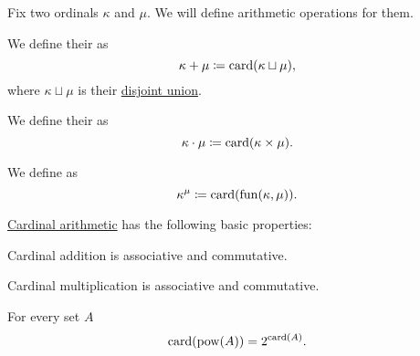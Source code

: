 \begin{definition}\label{def:cardinal_arithmetic}
  Fix two ordinals \( \kappa \) and \( \mu \). We will define arithmetic operations for them.

  \begin{thmenum}
     We define their  as
    \begin{equation*}
      \kappa + \mu \coloneqq \operatorname{card}(\kappa \sqcup \mu),
    \end{equation*}
    where \( \kappa \sqcup \mu \) is their \hyperref[def:disjoint_union]{disjoint union}.

     We define their  as
    \begin{equation*}
      \kappa \cdot \mu \coloneqq \operatorname{card}(\kappa \times \mu).
    \end{equation*}

     We define  as
    \begin{equation*}
      \kappa^\mu \coloneqq \operatorname{card}(\operatorname{fun}(\kappa, \mu)).
    \end{equation*}
  \end{thmenum}
\end{definition}

\begin{proposition}\label{thm:cardinal_arithmetic_properties}
  \hyperref[def:cardinal_arithmetic]{Cardinal arithmetic} has the following basic properties:

  \begin{thmenum}
     Cardinal addition is associative and commutative.

     Cardinal multiplication is associative and commutative.

     For every set \( A \)
    \begin{equation*}
      \operatorname{card}(\operatorname{pow}(A)) = 2^{\operatorname{card}(A)}.
    \end{equation*}
  \end{thmenum}
\end{proposition}
